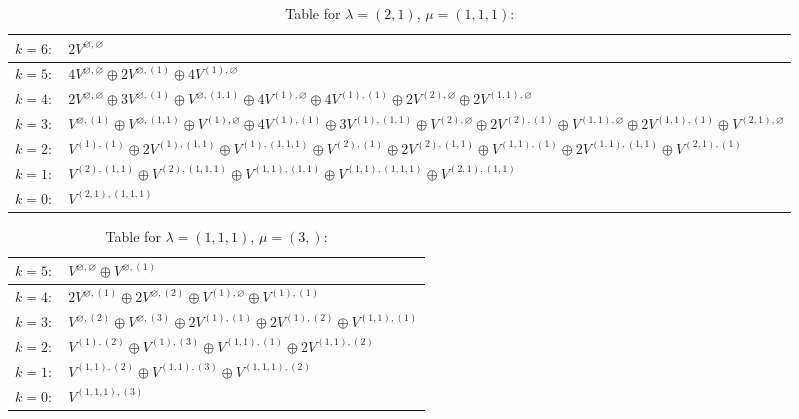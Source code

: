 \documentclass[a4paper,12pt]{article}
\begin{document}
\renewcommand{\arraystretch}{1.6} 
\begin{table}[H]
\centering
\caption{Table for $\lambda = (2, 1)$, $\mu = (1, 1, 1)$:}
\begin{tabular}{|>{\centering\arraybackslash}p{15cm}|}
\hline
 $k = 6: \quad 2 V^{\varnothing, \varnothing} $ \\ \hline
 $k = 5: \quad 4 V^{\varnothing, \varnothing} \oplus 2 V^{\varnothing, (1)} \oplus 4 V^{(1), \varnothing} $ \\ \hline
 $k = 4: \quad 2 V^{\varnothing, \varnothing} \oplus 3 V^{\varnothing, (1)} \oplus V^{\varnothing, (1, 1)} \oplus 4 V^{(1), \varnothing} \oplus 4 V^{(1), (1)} \oplus 2 V^{(2), \varnothing} \oplus 2 V^{(1, 1), \varnothing} $ \\ \hline
 $k = 3: \quad V^{\varnothing, (1)} \oplus V^{\varnothing, (1, 1)} \oplus V^{(1), \varnothing} \oplus 4 V^{(1), (1)} \oplus 3 V^{(1), (1, 1)} \oplus V^{(2), \varnothing} \oplus 2 V^{(2), (1)} \oplus V^{(1, 1), \varnothing} \oplus 2 V^{(1, 1), (1)} \oplus V^{(2, 1), \varnothing} $ \\ \hline
 $k = 2: \quad V^{(1), (1)} \oplus 2 V^{(1), (1, 1)} \oplus V^{(1), (1, 1, 1)} \oplus V^{(2), (1)} \oplus 2 V^{(2), (1, 1)} \oplus V^{(1, 1), (1)} \oplus 2 V^{(1, 1), (1, 1)} \oplus V^{(2, 1), (1)} $ \\ \hline
 $k = 1: \quad V^{(2), (1, 1)} \oplus V^{(2), (1, 1, 1)} \oplus V^{(1, 1), (1, 1)} \oplus V^{(1, 1), (1, 1, 1)} \oplus V^{(2, 1), (1, 1)} $ \\ \hline
 $k = 0: \quad V^{(2, 1), (1, 1, 1)} $ \\ \hline
\end{tabular}
\end{table}

\renewcommand{\arraystretch}{1.6} 
\begin{table}[H]
\centering
\caption{Table for $\lambda = (1, 1, 1)$, $\mu = (3,)$:}
\begin{tabular}{|>{\centering\arraybackslash}p{15cm}|}
\hline
 $k = 5: \quad V^{\varnothing, \varnothing} \oplus V^{\varnothing, (1)} $ \\ \hline
 $k = 4: \quad 2 V^{\varnothing, (1)} \oplus 2 V^{\varnothing, (2)} \oplus V^{(1), \varnothing} \oplus V^{(1), (1)} $ \\ \hline
 $k = 3: \quad V^{\varnothing, (2)} \oplus V^{\varnothing, (3)} \oplus 2 V^{(1), (1)} \oplus 2 V^{(1), (2)} \oplus V^{(1, 1), (1)} $ \\ \hline
 $k = 2: \quad V^{(1), (2)} \oplus V^{(1), (3)} \oplus V^{(1, 1), (1)} \oplus 2 V^{(1, 1), (2)} $ \\ \hline
 $k = 1: \quad V^{(1, 1), (2)} \oplus V^{(1, 1), (3)} \oplus V^{(1, 1, 1), (2)} $ \\ \hline
 $k = 0: \quad V^{(1, 1, 1), (3)} $ \\ \hline
\end{tabular}
\end{table}
\end{document}
